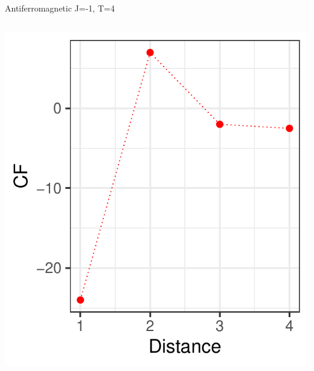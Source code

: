\documentclass{beamer}
\begin{document}
\begin{frame}{Antiferromagnetic J=-1, T=4}
\begin{columns}
\begin{column}{0.5\textwidth}
\begin{center}
     \includegraphics[width=\textwidth]{Pic/J-1_60_2500_T=4_CORRELATION.pdf}
     \end{center}
\end{column}
\end{columns}
\end{frame}
\end{document}
